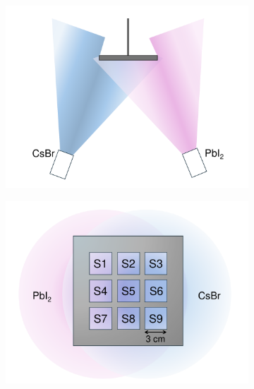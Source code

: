 \begin{figure}[htbp]
    \centering
    \begin{subfigure}[t]{0.49\textwidth} %
        \centering
        \includegraphics[width=\textwidth]{chapters/stability/imeges/Chamber - Side View.pdf} %
        \caption{}
        \label{}
    \end{subfigure}
    \begin{subfigure}[t]{0.49\textwidth} %
        \centering
        \includegraphics[width=\textwidth]{chapters/stability/imeges/Holder - Gradient - Schematic.pdf} %
        \caption{}        
        \label{}
    \end{subfigure}

    \caption{}   
    \label{}
\end{figure}


